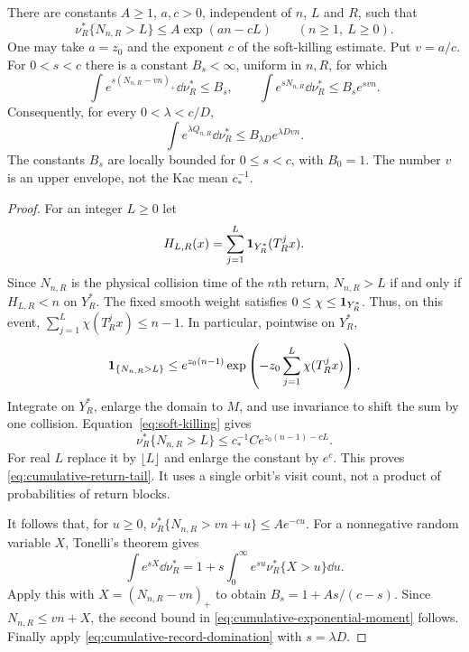 \begin{theorem}
\label{thm:cumulative-return-tail}
There are constants $A\ge1$, $a,c>0$, independent of $n$, $L$ and $R$,
such that
\begin{equation}\label{eq:cumulative-return-tail}
 \nu_R^*\{N_{n,R}>L\}\le A\exp(an-cL)
       \qquad(n\ge1,\ L\ge0).
\end{equation}
One may take $a=z_0$ and the exponent $c$ of the soft-killing estimate.
Put $v=a/c$. For $0<s<c$ there is a constant $B_s<\infty$, uniform in
$n,R$, for which
\begin{equation}\label{eq:cumulative-exponential-moment}
 \int e^{s(N_{n,R}-vn)_+}\dd\nu_R^*\le B_s,
 \qquad \int e^{sN_{n,R}}\dd\nu_R^*\le B_s e^{svn}.
\end{equation}
Consequently, for every $0<\lambda<c/D$,
\begin{equation}\label{eq:fixed-strip-record-moment}
 \int e^{\lambda Q_{n,R}}\dd\nu_R^*
          \le B_{\lambda D}e^{\lambda Dvn}.
\end{equation}
The constants $B_s$ are locally bounded for $0\le s<c$, with $B_0=1$.
The number $v$ is an upper envelope, not the Kac mean $c_*^{-1}$.
\end{theorem}
\begin{proof}
For an integer $L\ge0$ let
\[
 H_{L,R}(x)=\sum_{j=1}^{L}\mathbf1_{Y_R^*}(T_R^j x).
\]
Since $N_{n,R}$ is the physical collision time of the $n$th return,
$N_{n,R}>L$ if and only if $H_{L,R}<n$ on $Y_R^*$. The fixed smooth
weight satisfies $0\le\chi\le\mathbf1_{Y_R^*}$. Thus, on this event,
$\sum_{j=1}^{L}\chi(T_R^j x)\le n-1$. In particular, pointwise on
$Y_R^*$,
\[
 \mathbf1_{\{N_{n,R}>L\}}
 \le e^{z_0(n-1)}
       \exp\left(-z_0\sum_{j=1}^{L}\chi(T_R^j x)\right).
\]
Integrate on $Y_R^*$, enlarge the domain to $M$, and use invariance to
shift the sum by one collision. Equation~\eqref{eq:soft-killing} gives
\[
 \nu_R^*\{N_{n,R}>L\}\le c_*^{-1}C e^{z_0(n-1)-cL}.
\]
For real $L$ replace it by $\lfloor L\rfloor$ and enlarge the constant
by $e^c$. This proves \eqref{eq:cumulative-return-tail}. It uses a single
orbit's visit count, not a product of probabilities of return blocks.

It follows that, for $u\ge0$,
$\nu_R^*\{N_{n,R}>vn+u\}\le A e^{-cu}$. For a nonnegative random
variable $X$, Tonelli's theorem gives
\[
 \int e^{sX}\dd\nu_R^*
       =1+s\int_0^\infty e^{su}\nu_R^*\{X>u\}\dd u.
\]
Apply this with $X=(N_{n,R}-vn)_+$ to obtain
$B_s=1+As/(c-s)$. Since $N_{n,R}\le vn+X$, the second bound in
\eqref{eq:cumulative-exponential-moment} follows. Finally apply
\eqref{eq:cumulative-record-domination} with $s=\lambda D$.
\end{proof}

